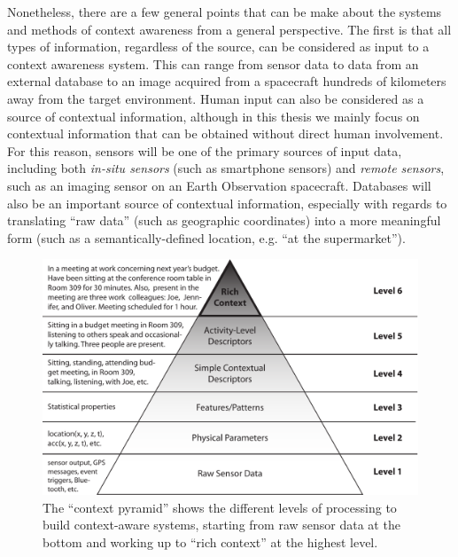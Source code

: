 Nonetheless, there are a few general points that can be make about the systems and methods of context awareness from a general perspective. The first is that all types of information, regardless of the source, can be considered as input to a context awareness system. This can range from sensor data to data from an external database to an image acquired from a spacecraft hundreds of kilometers away from the target environment. Human input can also be considered as a source of contextual information, although in this thesis we mainly focus on contextual information that can be obtained without direct human involvement. For this reason, sensors will be one of the primary sources of input data, including both \emph{in-situ sensors} (such as smartphone sensors) and \emph{remote sensors}, such as an imaging sensor on an Earth Observation spacecraft. Databases will also be an important source of contextual information, especially with regards to translating ``raw data'' (such as geographic coordinates) into a more meaningful form (such as a semantically-defined location, e.g. ``at the supermarket'').
%
\begin{figure}[t]
  \begin{center}
    \includegraphics[width=1.0\textwidth]{ContextPyramid4}
  \end{center}
  \caption[The Context Pyramid]{The ``context pyramid'' shows the different levels of processing to build context-aware systems, starting from raw sensor data at the bottom and working up to ``rich context'' at the highest level.}
  \label{fig:context_pyramid}
\end{figure}
%
